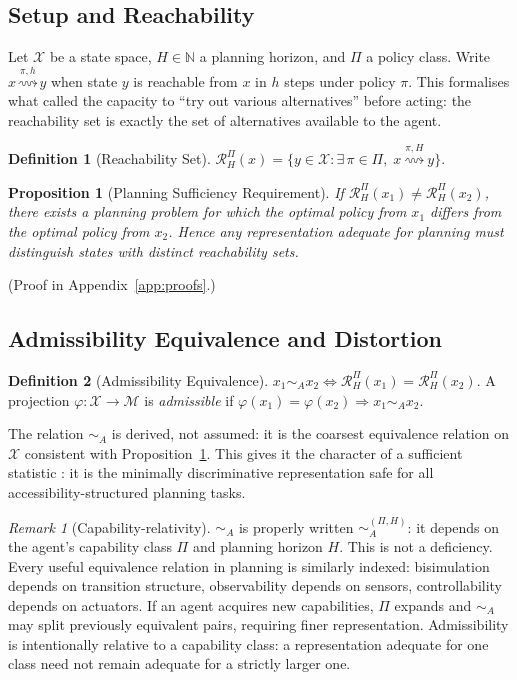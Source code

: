 \documentclass[10pt,twocolumn]{article}
\theoremstyle{plain}
\newtheorem{proposition}{Proposition}
\theoremstyle{definition}
\newtheorem{definition}{Definition}
\theoremstyle{remark}
\newtheorem{remark}{Remark}
\newcommand{\simA}{\sim_{\!A}}
\newcommand{\RHP}{\mathcal{R}_{H}^{\Pi}}
\newcommand{\calX}{\mathcal{X}}
\newcommand{\calM}{\mathcal{M}}
\begin{document}
\subsection{Setup and Reachability}

Let $\calX$ be a state space, $H\in\mathbb{N}$ a planning horizon, and $\Pi$
a policy class. Write $x \overset{\pi,h}{\rightsquigarrow} y$ when state $y$
is reachable from $x$ in $h$ steps under policy $\pi$. This formalises what
\citet{craik1943nature} called the capacity to ``try out various alternatives''
before acting: the reachability set is exactly the set of alternatives available
to the agent.

\begin{definition}[Reachability Set]
\label{def:reach}
$\RHP(x) = \{y\in\calX : \exists\,\pi\in\Pi,\; x\overset{\pi,H}{\rightsquigarrow}y\}$.
\end{definition}

\begin{proposition}[Planning Sufficiency Requirement]
\label{prop:planning}
If $\RHP(x_1)\neq\RHP(x_2)$, there exists a planning problem for which the
optimal policy from $x_1$ differs from the optimal policy from $x_2$. Hence any
representation adequate for planning must distinguish states with distinct
reachability sets.
\end{proposition}

\noindent(Proof in Appendix~\ref{app:proofs}.)

\subsection{Admissibility Equivalence and Distortion}

\begin{definition}[Admissibility Equivalence]
\label{def:admissibility}
$x_1 \simA x_2 \iff \RHP(x_1) = \RHP(x_2)$.
A projection $\varphi:\calX\to\calM$ is \emph{admissible} if
$\varphi(x_1)=\varphi(x_2)\Rightarrow x_1\simA x_2$.
\end{definition}

The relation $\simA$ is derived, not assumed: it is the coarsest equivalence
relation on $\calX$ consistent with Proposition~\ref{prop:planning}. This gives
it the character of a sufficient statistic \citep{fisher1922mathematical}: it is
the minimally discriminative representation safe for all accessibility-structured
planning tasks.

\begin{remark}[Capability-relativity]
\label{rem:relativity}
$\simA$ is properly written $\sim_A^{(\Pi,H)}$: it depends on the agent's
capability class $\Pi$ and planning horizon $H$. This is not a deficiency.
Every useful equivalence relation in planning is similarly indexed: bisimulation
depends on transition structure, observability depends on sensors, controllability
depends on actuators. If an agent acquires new capabilities, $\Pi$ expands and
$\simA$ may split previously equivalent pairs, requiring finer representation.
Admissibility is intentionally relative to a capability class: a representation
adequate for one class need not remain adequate for a strictly larger one.
\end{remark}
\end{document}
